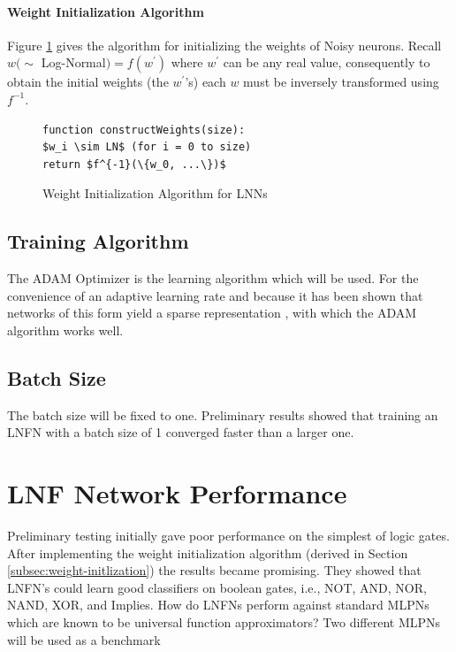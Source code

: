 \noindent
\begin{minipage}[t]{0.48\textwidth}
\vspace{0px}
\paragraph{Weight Initialization Algorithm}
Figure \ref{alg:lnn-initlization} gives the algorithm for initializing the weights of Noisy neurons. Recall $w (\sim$ Log-Normal$) = f(w^{'})$ where $w^{'}$ can be any real value, consequently to obtain the initial weights (the $w^{'}$'s) each $w$ must be inversely transformed using $f^{-1}$.
\end{minipage}
\hspace{0.05\textwidth}
\begin{minipage}[t]{0.47\textwidth}
\vspace{0px}
\begin{figure}[H]
	\begin{lstlisting}[mathescape=true]
function constructWeights(size):
$w_i \sim LN$ (for i = 0 to size)
return $f^{-1}(\{w_0, ...\})$
\end{lstlisting}
	\caption{Weight Initialization Algorithm for LNNs}
	\label{alg:lnn-initlization}
\end{figure}
\end{minipage}

\subsection{Training Algorithm}
The ADAM Optimizer \cite{kingma2014adam} is the learning algorithm which will be used. For the convenience of an adaptive learning rate and because it has been shown that networks of this form yield a sparse representation \cite{LearningLogicalActivations}, with which the ADAM algorithm works well.

\subsection{Batch Size}
The batch size will be fixed to one. Preliminary results showed that training an LNFN with a batch size of 1 converged faster than a larger one. 

\section{LNF Network Performance}
Preliminary testing initially gave poor performance on the simplest of logic gates. After implementing the weight initialization algorithm (derived in Section \ref{subsec:weight-initlization}) the results became promising. They showed that LNFN's could learn good classifiers on boolean gates, i.e., NOT, AND, NOR, NAND, XOR, and Implies. How do LNFNs perform against standard MLPNs which are known to be universal function approximators? Two different MLPNs will be used as a benchmark

